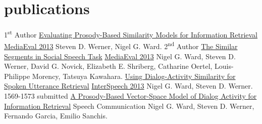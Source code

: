 \documentclass[]{friggeri-cv} %
\begin{document}

\section{publications}

\begin{entrylist}
\entry
{1\textsuperscript{st} Author}
{\href{http://ceur-ws.org/Vol-1043/mediaeval2013_submission_52.pdf}{Evaluating Prosody-Based Similarity Models for Information Retrieval}}
{\href{http://ceur-ws.org/Vol-1043/}{MediaEval 2013}}
{Steven D. Werner, Nigel G. Ward.}
\entry
{2\textsuperscript{nd} Author}
{\href{http://ceur-ws.org/Vol-1043/mediaeval2013_submission_2.pdf}{The Similar Segments in Social Speech Task} }
{\href{http://ceur-ws.org/Vol-1043/}{MediaEval 2013}}
{Nigel G. Ward, Steven D. Werner, David G. Novick, Elizabeth E. Shriberg, Catharine Oertel, Louis-Philippe Morency, Tatsuya Kawahara.}
\entry
{}
{\href{http://www.isca-speech.org/archive/interspeech_2013/i13_1569.html}{Using Dialog-Activity Similarity for Spoken Utterance Retrieval}}
{\href{http://www.isca-speech.org/archive/interspeech_2013/}{InterSpeech 2013}}
{Nigel G. Ward, Steven D. Werner. 1569-1573}
\entry
{submitted}
{\href{http://www.cs.utep.edu/nigel/abstracts/prosody-ir.html}{A Prosody-Based Vector-Space Model of Dialog Activity for Information Retrieval}}
{Speech Communication}
{Nigel G. Ward, Steven D. Werner, Fernando Garcia, Emilio Sanchis.}
\end{entrylist}
\end{document}
